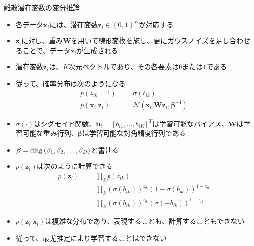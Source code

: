 \documentclass[dvipdfmx,notheorems,t]{beamer}
\begin{document}
\begin{frame}{離散潜在変数の変分推論}
\begin{itemize}
\begin{itemize}
		\item 各データ$\bm{x}_i$には、潜在変数$\bm{z}_i \in \left\{ 0, 1 \right\}^K$が対応する
		\item $\bm{z}_i$に対し、重み$\bm{W}$を用いて\alert{線形変換}を施し、更に\alert{ガウスノイズ}を足し合わせることで、データ$\bm{x}_i$が生成される
		\newline
		
		\item 潜在変数$\bm{z}_i$は、$K$次元ベクトルであり、その\color{red}各要素は$0$または$1$\normalcolor である
		\newline
		
		\item 従って、確率分布は次のようになる
		\begin{eqnarray}
			p(z_{ik} = 1) &=& \sigma(b_{ik}) \\
			p(\bm{x}_i | \bm{z}_i) &=& \mathcal{N}(\bm{x}_i | \bm{W} \bm{z}_i, \bm{\beta}^{-1})
		\end{eqnarray}
		
		\item $\sigma(\cdot)$はシグモイド関数、$\bm{b}_i = \left[ b_{i1}, \ldots, b_{iK} \right]^T$は学習可能な\alert{バイアス}、$\bm{W}$は学習可能な\alert{重み行列}、$\bm{\beta}$は学習可能な\alert{対角精度行列}である
		\item $\bm{\beta} = \operatorname{diag} \left( \beta_1, \beta_2, \ldots, \beta_D \right)$と書ける
		\newline
		
		\item $p(\bm{z}_i)$は次のように計算できる
		\begin{eqnarray}
			p(\bm{z}_i) &=& \prod_k p(z_{ik}) \\
			&=& \prod_k \left( \sigma(b_{ik}) \right)^{z_{ik}} \left( 1 - \sigma(b_{ik}) \right)^{1 - z_{ik}} \\
			&=& \prod_k \left( \sigma(b_{ik}) \right)^{z_{ik}} \left( \sigma(-b_{ik}) \right)^{1 - z_{ik}}
		\end{eqnarray}
		
		\item $p(\bm{z}_i | \bm{x}_i)$は\alert{複雑な分布}であり、表現することも、計算することもできない
		\item 従って、最尤推定により学習することはできない
		\newline
		

\end{itemize}
\end{itemize}
\end{frame}
\end{document}

